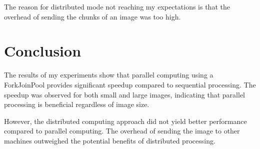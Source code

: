 \documentclass{article}
\begin{document}
\begin{multicols}{2}
    The reason for distributed mode not reaching my expectations is that the overhead of sending the chunks of an image was too high.

    \section{Conclusion}

    The results of my experiments show that parallel computing using a ForkJoinPool provides significant speedup compared to sequential processing. The speedup was observed for both small and large images, indicating that parallel processing is beneficial regardless of image size.

    However, the distributed computing approach did not yield better performance compared to parallel computing. The overhead of sending the image to other machines outweighed the potential benefits of distributed processing.

\end{multicols}

\printbibliography[heading=bibintoc, title={References}]

\end{document}
